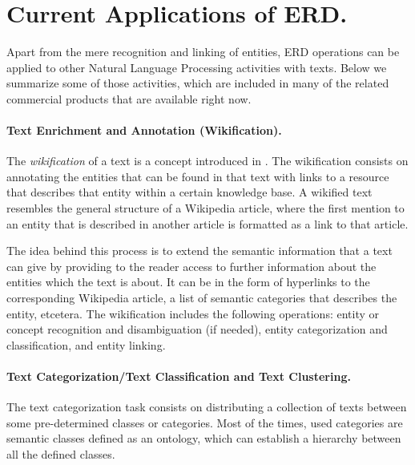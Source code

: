 \newcommand{\cabeceraGirada}[2]{
	\mbox{\hspace{-2pt}\rlap{\rotatebox{#1}{#2}}}
}

\section{Current Applications of ERD.}
\label{sec:applicationsNED}

Apart from the mere recognition and linking of entities, ERD operations can be applied to other Natural Language Processing activities with texts. Below we summarize some of those activities, which are included in many of the related commercial products that are available right now.

\paragraph{Text Enrichment and Annotation (Wikification).}

The \emph{wikification} of a text is a concept introduced in \cite{mihalcea2007}. The wikification consists on annotating the entities that can be found in that text with links to a resource that describes that entity within a certain knowledge base. A wikified text resembles the general structure of a Wikipedia article, where the first mention to an entity that is described in another article is formatted as a link to that article.

The idea behind this process is to extend the semantic information that a text can give by providing to the reader access to further information about the entities which the text is about. It can be in the form of hyperlinks to the corresponding Wikipedia article, a list of semantic categories that describes the entity, etcetera. The wikification includes the following operations: entity or concept recognition and disambiguation (if needed), entity categorization and classification, and entity linking.

\paragraph{Text Categorization/Text Classification and Text Clustering.}

The text categorization task consists on distributing a collection of texts between some pre-determined classes or categories. Most of the times, used categories are semantic classes defined as an ontology, which can establish a hierarchy between all the defined classes.

